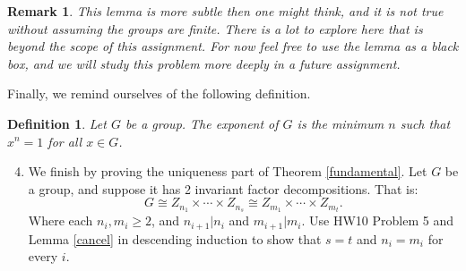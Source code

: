 \documentclass[11pt]{article}
\newtheorem*{remark}{Remark}
\newtheorem{definition}{Definition}
\begin{document}
\begin{remark}
  This lemma is more subtle then one might think, and it is not true without assuming the groups are finite.  There is a lot to explore here that is beyond the scope of this assignment.  For now feel free to use the lemma as a black box, and we will study this problem more deeply in a future assignment.
\end{remark}
Finally, we remind ourselves of the following definition.
\begin{definition}
  Let $G$ be a group.  The \textit{exponent} of $G$ is the minimum $n$ such that $x^n=1$ for all $x\in G$.
\end{definition}
\begin{enumerate}
  \setcounter{enumi}{3}
  \item{
  We finish by proving the uniqueness part of Theorem \ref{fundamental}.  Let $G$ be a group, and suppose it has 2 invariant factor decompositions.  That is:
  \[G \cong Z_{n_1}\times\cdots\times Z_{n_s}\cong Z_{m_1}\times\cdots\times Z_{m_t}.\]
  Where each $n_i,m_i\ge2$, and $n_{i+1}|n_i$ and $m_{i+1}|m_i$.  Use HW10 Problem 5 and Lemma \ref{cancel} in descending induction to show that $s=t$ and $n_i=m_i$ for every $i$.
  }
\end{enumerate}
\end{document}
